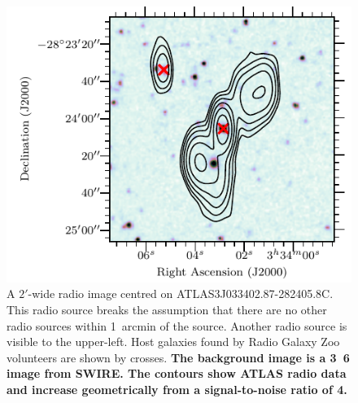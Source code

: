\documentclass[fleqn,usenatbib,usedcolumn]{mnras}
\newcommand{\edited}[1]{{\bf {#1}}}
\begin{document}
    \begin{figure}
      \centering
      \includegraphics[width=\linewidth]{images/CI0077C1_fig.pdf}
      \caption{A $2'$-wide radio image centred on ATLAS3\textunderscore{}J033402.87-282405.8C.
        This radio source breaks the assumption that there are no other radio
        sources within 1~arcmin of the source. Another radio source is visible
        to the upper-left. Host galaxies found by Radio Galaxy Zoo volunteers
        are shown by crosses. \edited{The background image
        is a \unit{3.6}{\micro\meter} image from SWIRE. The contours show ATLAS radio
        data and increase geometrically from a signal-to-noise ratio of 4.}}
      \label{fig:broken-isolation}
    \end{figure}
\end{document}
